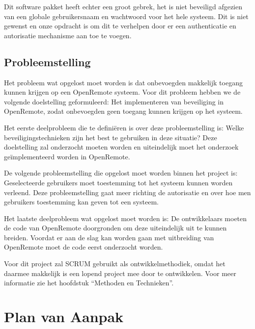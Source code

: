 \documentclass{article}
\begin{document}
Dit software pakket heeft echter een groot gebrek, het is niet beveiligd
afgezien van een globale gebruikersnaam en wachtwoord voor het hele
systeem. Dit is niet gewenst en onze opdracht is om dit te verhelpen door
er een authenticatie en autorisatie mechanisme aan toe te voegen.

\subsection{Probleemstelling}

Het probleem wat opgelost moet worden is dat onbevoegden makkelijk toegang
kunnen krijgen op een OpenRemote systeem. Voor dit probleem hebben we de
volgende doelstelling geformuleerd: Het implementeren van beveiliging in
OpenRemote, zodat onbevoegden geen toegang kunnen krijgen op het systeem.

Het eerste deelprobleem die te definiëren is over deze probleemstelling is:
Welke beveiligingstechnieken zijn het best te gebruiken in deze situatie?
Deze doelstelling zal onderzocht moeten worden en uiteindelijk moet het
onderzoek geïmplementeerd worden in OpenRemote.

De volgende probleemstelling die opgelost moet worden binnen het project
is: Geselecteerde gebruikers moet toestemming tot het systeem kunnen worden
verleend. Deze probleemstelling gaat meer richting de autorisatie en over
hoe men gebruikers toestemming kan geven tot een systeem.

Het laatste deelprobleem wat opgelost moet worden is: De ontwikkelaars
moeten de code van OpenRemote doorgronden om deze uiteindelijk uit te
kunnen breiden. Voordat er aan de slag kan worden gaan met uitbreiding van
OpenRemote moet de code eerst onderzocht worden.

Voor dit project zal SCRUM gebruikt als ontwikkelmethodiek, omdat het
daarmee makkelijk is een lopend project mee door te ontwikkelen. Voor meer
informatie zie het hoofdstuk “Methoden en Technieken”.

\newpage
\section{Plan van Aanpak}
\end{document}

